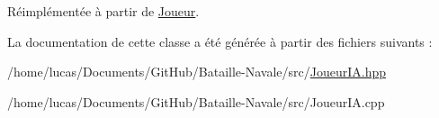 Réimplémentée à partir de \hyperlink{class_joueur_a46bdd92b73a1f0d04aeb5f19f33720b0}{Joueur}.



La documentation de cette classe a été générée à partir des fichiers suivants \+:\begin{DoxyCompactItemize}
\item 
/home/lucas/\+Documents/\+Git\+Hub/\+Bataille-\/\+Navale/src/\hyperlink{_joueur_i_a_8hpp}{Joueur\+I\+A.\+hpp}\item 
/home/lucas/\+Documents/\+Git\+Hub/\+Bataille-\/\+Navale/src/Joueur\+I\+A.\+cpp\end{DoxyCompactItemize}

